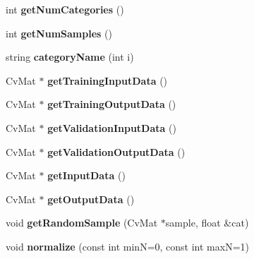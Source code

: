 \begin{DoxyCompactItemize}
\item 
\hypertarget{class_m_l_data_a38fe7db4f2dae1661064205e0a6878af}{int {\bfseries get\-Num\-Categories} ()}\label{class_m_l_data_a38fe7db4f2dae1661064205e0a6878af}

\item 
\hypertarget{class_m_l_data_aac7550c01b65a1c5d8ed507747a04a8b}{int {\bfseries get\-Num\-Samples} ()}\label{class_m_l_data_aac7550c01b65a1c5d8ed507747a04a8b}

\item 
\hypertarget{class_m_l_data_a31914b82de776f902052f1213efa896b}{string {\bfseries category\-Name} (int i)}\label{class_m_l_data_a31914b82de776f902052f1213efa896b}

\item 
\hypertarget{class_m_l_data_aa4b8995b0a97a1faf7b2258f86408f83}{Cv\-Mat $\ast$ {\bfseries get\-Training\-Input\-Data} ()}\label{class_m_l_data_aa4b8995b0a97a1faf7b2258f86408f83}

\item 
\hypertarget{class_m_l_data_ac9e06876eae95f366ef51188a48b6a3f}{Cv\-Mat $\ast$ {\bfseries get\-Training\-Output\-Data} ()}\label{class_m_l_data_ac9e06876eae95f366ef51188a48b6a3f}

\item 
\hypertarget{class_m_l_data_a5ec198b6c3f692964aa9689accf5285c}{Cv\-Mat $\ast$ {\bfseries get\-Validation\-Input\-Data} ()}\label{class_m_l_data_a5ec198b6c3f692964aa9689accf5285c}

\item 
\hypertarget{class_m_l_data_a439138752754f0c033cc1ff3e667d1df}{Cv\-Mat $\ast$ {\bfseries get\-Validation\-Output\-Data} ()}\label{class_m_l_data_a439138752754f0c033cc1ff3e667d1df}

\item 
\hypertarget{class_m_l_data_a787d53de79ee63d2b3e9093aca02240b}{Cv\-Mat $\ast$ {\bfseries get\-Input\-Data} ()}\label{class_m_l_data_a787d53de79ee63d2b3e9093aca02240b}

\item 
\hypertarget{class_m_l_data_a32df894be857548ce30aac4703050a32}{Cv\-Mat $\ast$ {\bfseries get\-Output\-Data} ()}\label{class_m_l_data_a32df894be857548ce30aac4703050a32}

\item 
\hypertarget{class_m_l_data_ae2b83af78f54a4304db5514516e5e691}{void {\bfseries get\-Random\-Sample} (Cv\-Mat $\ast$sample, float \&cat)}\label{class_m_l_data_ae2b83af78f54a4304db5514516e5e691}

\item 
\hypertarget{class_m_l_data_a0dbafa975f61f0c22ff91aa61a76c776}{void {\bfseries normalize} (const int min\-N=0, const int max\-N=1)}\label{class_m_l_data_a0dbafa975f61f0c22ff91aa61a76c776}

\end{DoxyCompactItemize}
